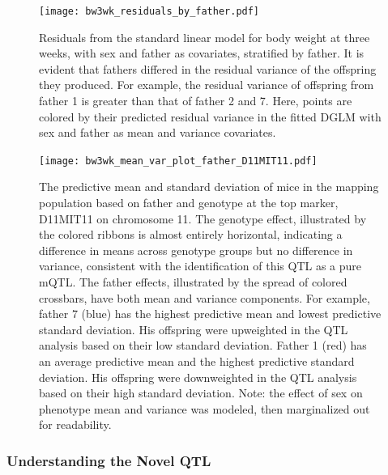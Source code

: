     \begin{figure}
        \centering
        \texttt{[image: bw3wk\_residuals\_by\_father.pdf]}
        \caption[
          Residuals from the standard linear model for body weight at three weeks, with sex and father as covariates, stratified by father.
        ]
        {
          Residuals from the standard linear model for body weight at three weeks, with sex and father as covariates, stratified by father.
          It is evident that fathers differed in the residual variance of the offspring they produced.
          For example, the residual variance of offspring from father 1 is greater than that of father 2 and 7.
          Here, points are colored by their predicted residual variance in the fitted DGLM with sex and father as mean and variance covariates.
        }
        \label{fig:bw3wk_resids}
    \end{figure}

    \begin{figure}
        \centering
        \texttt{[image: bw3wk\_mean\_var\_plot\_father\_D11MIT11.pdf]}
        \caption[
          The predictive mean and standard deviation of mice in the mapping population based on father and genotype at the top marker, D11MIT11 on chromosome 11.
        ]
        {
          The predictive mean and standard deviation of mice in the mapping population based on father and genotype at the top marker, D11MIT11 on chromosome 11.
          The genotype effect, illustrated by the colored ribbons is almost entirely horizontal, indicating a difference in means across genotype groups but no difference in variance, consistent with the identification of this QTL as a pure mQTL.
          The father effects, illustrated by the spread of colored crossbars, have both mean and variance components.
          For example, father 7 (blue) has the highest predictive mean and lowest predictive standard deviation.
          His offspring were upweighted in the QTL analysis based on their low standard deviation.
          Father 1 (red) has an average predictive mean and the highest predictive standard deviation.
          His offspring were downweighted in the QTL analysis based on their high standard deviation.
          Note: the effect of sex on phenotype mean and variance was modeled, then marginalized out for readability.
        }
        \label{fig:bw3wk_meanvar}
    \end{figure}

    \subsubsection{Understanding the Novel QTL}

